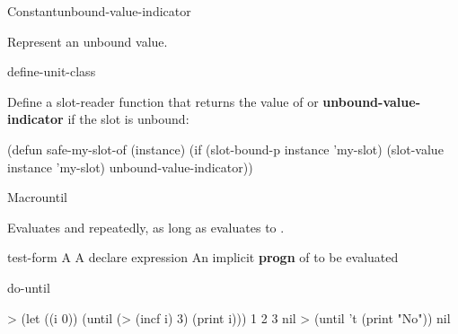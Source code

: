 \documentclass[10pt,twoside,english,pdftex]{article}
\begin{document}
\begin{functiondoc}{Constant}{unbound-value-indicator}{}%

\fnsyntax

\fnpurpose Represent an unbound value.

\fnpackage {}

\fnmodule {}

\begin{alsos}{define-unit-class}
\end{alsos}

\fnexample
Define a slot-reader function that returns the value of  or 
\textbf{unbound-value-indicator} if the slot is unbound: 
\begin{example}
(defun safe-my-slot-of (instance)
  (if (slot-bound-p instance 'my-slot)
      (slot-value instance 'my-slot)
      unbound-value-indicator))
\end{example}

\end{functiondoc}


\begin{functiondoc}{Macro}{until}{ 
    \superstar{}
    \superstar}
%
  
\fnsyntax

\fnpurpose Evaluates  and  repeatedly,
as long as  evaluates to \nil.

\fnpackage {}

\fnmodule {}

\fnargs
\begin{args}{test-form}
 A 
\arg[declaration] A declare expression
\arg[forms] An implicit \textbf{progn} of  to be evaluated
\end{args}

\begin{alsos}{do-until}
\also[do-until]
\also[while]
\end{alsos}

\fnexamples
\begin{example}
> (let ((i 0)) 
    (until (> (incf i) 3) 
       (print i)))
1 
2 
3 
nil
> (until 't (print "No"))
nil
\end{example}

\end{functiondoc}
\end{document}
